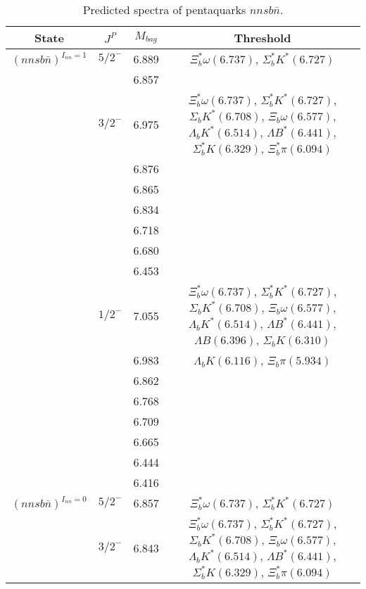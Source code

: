\documentclass[prd,twocolumn,floatfix,nofootinbib]{revtex4}
\begin{document}
\renewcommand{\tabcolsep}{0.3cm}
\renewcommand{\arraystretch}{1.2}
\begin{table*}[!htbp]
    \caption{Predicted spectra of pentaquarks $nnsb\bar{n}$.}
    \begin{tabular}{cccc}
        \hline\hline
        {\rm State} &$J^{P}$ &$M_{bag}$ &Threshold \\ \hline
        ${(nnsb\bar{n})}^{I_{nn}=1}$
            &${5/2}^{-}$    &6.889  &$\Xi_{b}^{\ast}\omega(6.737)$, $\Sigma_{b}^{\ast}K^{\ast}(6.727)$ \\
            &               &6.857  & \\
            &${3/2}^{-}$    &6.975  &$\Xi_{b}^{\ast}\omega(6.737)$, $\Sigma_{b}^{\ast}K^{\ast}(6.727)$, $\Sigma_{b}K^{\ast}(6.708)$, $\Xi_{b}\omega(6.577)$, $\Lambda_{b}K^{\ast}(6.514)$, $\Lambda B^{\ast}(6.441)$, $\Sigma_{b}^{\ast}K(6.329)$, $\Xi_{b}^{\ast}\pi(6.094)$ \\
            &               &6.876  & \\
            &               &6.865  & \\
            &               &6.834  & \\
            &               &6.718  & \\
            &               &6.680  & \\
            &               &6.453  & \\
            &${1/2}^{-}$    &7.055  &$\Xi_{b}^{\ast}\omega(6.737)$, $\Sigma_{b}^{\ast}K^{\ast}(6.727)$, $\Sigma_{b}K^{\ast}(6.708)$, $\Xi_{b}\omega(6.577)$, $\Lambda_{b}K^{\ast}(6.514)$, $\Lambda B^{\ast}(6.441)$, $\Lambda B(6.396)$, $\Sigma_{b}K(6.310)$ \\
            &               &6.983  &$\Lambda_{b}K(6.116)$, $\Xi_{b}\pi(5.934)$ \\
            &               &6.862  & \\
            &               &6.768  & \\
            &               &6.709  & \\
            &               &6.665  & \\
            &               &6.444  & \\
            &               &6.416  & \\
        ${(nnsb\bar{n})}^{I_{nn}=0}$
            &${5/2}^{-}$    &6.857  &$\Xi_{b}^{\ast}\omega(6.737)$, $\Sigma_{b}^{\ast}K^{\ast}(6.727)$ \\
            &${3/2}^{-}$    &6.843  &$\Xi_{b}^{\ast}\omega(6.737)$, $\Sigma_{b}^{\ast}K^{\ast}(6.727)$, $\Sigma_{b}K^{\ast}(6.708)$, $\Xi_{b}\omega(6.577)$, $\Lambda_{b}K^{\ast}(6.514)$, $\Lambda B^{\ast}(6.441)$, $\Sigma_{b}^{\ast}K(6.329)$, $\Xi_{b}^{\ast}\pi(6.094)$ \\

\end{tabular}
\end{table*}
\end{document}
